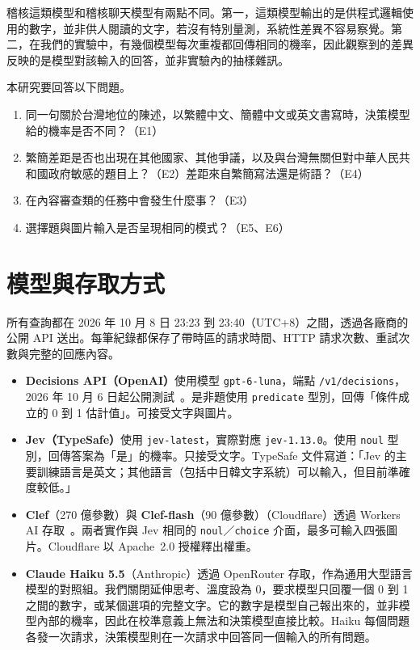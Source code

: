 \documentclass[11pt]{article}
\begin{document}
稽核這類模型和稽核聊天模型有兩點不同。第一，這類模型輸出的是供程式邏輯使用的數字，並非供人閱讀的文字，若沒有特別量測，系統性差異不容易察覺。第二，在我們的實驗中，有幾個模型每次重複都回傳相同的機率，因此觀察到的差異反映的是模型對該輸入的回答，並非實驗內的抽樣雜訊。

本研究要回答以下問題。
\begin{enumerate}
\item 同一句關於台灣地位的陳述，以繁體中文、簡體中文或英文書寫時，決策模型給的機率是否不同？（E1）
\item 繁簡差距是否也出現在其他國家、其他爭議，以及與台灣無關但對中華人民共和國政府敏感的題目上？（E2）差距來自繁簡寫法還是術語？（E4）
\item 在內容審查類的任務中會發生什麼事？（E3）
\item 選擇題與圖片輸入是否呈現相同的模式？（E5、E6）
\end{enumerate}

\section{模型與存取方式}

所有查詢都在 2026 年 10 月 8 日 23:23 到 23:40（UTC+8）之間，透過各廠商的公開 API 送出。每筆紀錄都保存了帶時區的請求時間、HTTP 請求次數、重試次數與完整的回應內容。

\begin{itemize}
\item \textbf{Decisions API（OpenAI）}使用模型 \texttt{gpt-6-luna}，端點 \texttt{/v1/decisions}，2026 年 10 月 6 日起公開測試~\cite{openai}。是非題使用 \texttt{predicate} 型別，回傳「條件成立的 0 到 1 估計值」。可接受文字與圖片。
\item \textbf{Jev（TypeSafe）}使用 \texttt{jev-latest}，實際對應 \texttt{jev-1.13.0}。使用 \texttt{noul} 型別，回傳答案為「是」的機率。只接受文字。TypeSafe 文件寫道：「Jev 的主要訓練語言是英文；其他語言（包括中日韓文字系統）可以輸入，但目前準確度較低。」~\cite{typesafedocs}
\item \textbf{Clef}（270 億參數）與 \textbf{Clef-flash}（90 億參數）（Cloudflare）透過 Workers AI 存取~\cite{cloudflare}。兩者實作與 Jev 相同的 \texttt{noul}／\texttt{choice} 介面，最多可輸入四張圖片。Cloudflare 以 Apache~2.0 授權釋出權重。
\item \textbf{Claude Haiku 5.5}（Anthropic）透過 OpenRouter 存取，作為通用大型語言模型的對照組。我們關閉延伸思考、溫度設為 0，要求模型只回覆一個 0 到 1 之間的數字，或某個選項的完整文字。它的數字是模型自己報出來的，並非模型內部的機率，因此在校準意義上無法和決策模型直接比較。Haiku 每個問題各發一次請求，決策模型則在一次請求中回答同一個輸入的所有問題。
\end{itemize}
\end{document}
